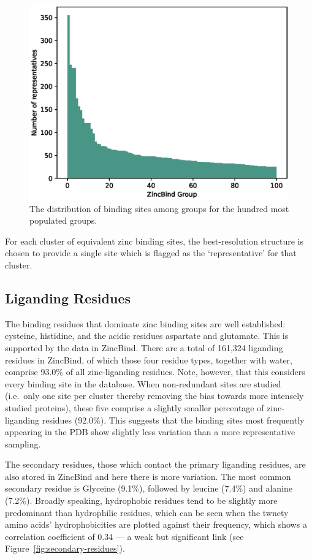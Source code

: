 \begin{figure}
\centering
\includegraphics[width=1.0\textwidth]{Figures/group-clusters.eps}
\caption{\label{fig:group-clusters} The distribution of binding sites among groups for the hundred most populated groups.}
\end{figure}

For each cluster of equivalent zinc binding sites, the best-resolution structure is chosen to provide a single site which is flagged as the `representative' for that cluster.

\subsection{Liganding Residues}

The binding residues that dominate zinc binding sites are well established: cysteine, histidine, and the acidic residues aspartate and glutamate. This is supported by the data in ZincBind. There are a total of 161,324 liganding residues in ZincBind, of which those four residue types, together with water, comprise 93.0\% of all zinc-liganding residues. Note, however, that this considers every binding site in the database. When non-redundant sites are studied (i.e.\ only one site per cluster thereby removing the bias towards more intensely studied proteins), these five comprise a slightly smaller percentage of zinc-liganding residues (92.0\%). This suggests that the binding sites most frequently appearing in the PDB show slightly less variation than a more representative sampling.

The secondary residues, those which contact the primary liganding residues, are also stored in ZincBind and here there is more variation. The most common secondary residue is Glyceine (9.1\%), followed by leucine (7.4\%) and alanine (7.2\%). Broadly speaking, hydrophobic residues tend to be slightly more predominant than hydrophilic residues, which can be seen when the twnety amino acids' hydrophobicities are plotted against their frequency, which shows a correlation coefficient of 0.34 --- a weak but significant link (see Figure~\ref{fig:secondary-residues}).

